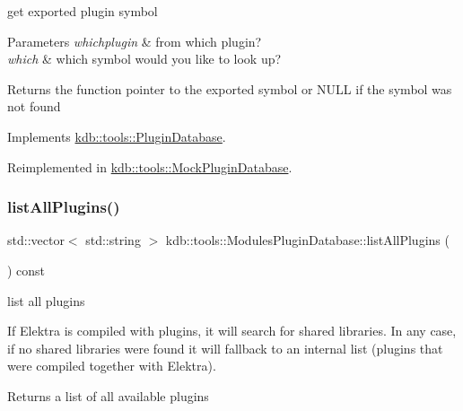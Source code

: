 get exported plugin symbol 


\begin{DoxyParams}{Parameters}
{\em whichplugin} & from which plugin? \\
\hline
{\em which} & which symbol would you like to look up?\\
\hline
\end{DoxyParams}
\begin{DoxyReturn}{Returns}
the function pointer to the exported symbol or N\+U\+LL if the symbol was not found 
\end{DoxyReturn}


Implements \mbox{\hyperlink{classkdb_1_1tools_1_1PluginDatabase_a87b5ef6ee66ce1ad46cc590a2b60b9fa}{kdb\+::tools\+::\+Plugin\+Database}}.



Reimplemented in \mbox{\hyperlink{classkdb_1_1tools_1_1MockPluginDatabase_a5a701fd310be0e9f7d14a865c0226517}{kdb\+::tools\+::\+Mock\+Plugin\+Database}}.

\mbox{\label{classkdb_1_1tools_1_1ModulesPluginDatabase_a3fa5a08caf47cb79f9889641a96f197b}} 
\subsubsection{\texorpdfstring{listAllPlugins()}{listAllPlugins()}}
{\footnotesize\ttfamily std\+::vector$<$ std\+::string $>$ kdb\+::tools\+::\+Modules\+Plugin\+Database\+::list\+All\+Plugins (\begin{DoxyParamCaption}{ }\end{DoxyParamCaption}) const\hspace{0.3cm}{\ttfamily [virtual]}}



list all plugins 

If Elektra is compiled with plugins, it will search for shared libraries. In any case, if no shared libraries were found it will fallback to an internal list (plugins that were compiled together with Elektra).

\begin{DoxyReturn}{Returns}
a list of all available plugins 
\end{DoxyReturn}


